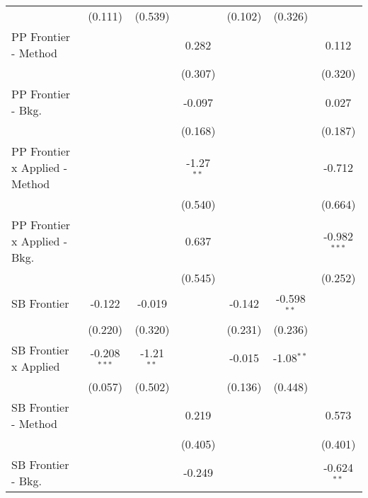 \begin{tabular}{lcccccc}
                                  & (0.111)        & (0.539)      &               & (0.102)       & (0.326)       &   \\   
   PP Frontier - Method           &                &              & 0.282         &               &               & 0.112\\   
                                  &                &              & (0.307)       &               &               & (0.320)\\   
   PP Frontier - Bkg.             &                &              & -0.097        &               &               & 0.027\\   
                                  &                &              & (0.168)       &               &               & (0.187)\\   
   PP Frontier x Applied - Method &                &              & -1.27$^{**}$  &               &               & -0.712\\   
                                  &                &              & (0.540)       &               &               & (0.664)\\   
   PP Frontier x Applied - Bkg.   &                &              & 0.637         &               &               & -0.982$^{***}$\\   
                                  &                &              & (0.545)       &               &               & (0.252)\\   
   SB Frontier                    & -0.122         & -0.019       &               & -0.142        & -0.598$^{**}$ &   \\   
                                  & (0.220)        & (0.320)      &               & (0.231)       & (0.236)       &   \\   
   SB Frontier x Applied          & -0.208$^{***}$ & -1.21$^{**}$ &               & -0.015        & -1.08$^{**}$  &   \\   
                                  & (0.057)        & (0.502)      &               & (0.136)       & (0.448)       &   \\   
   SB Frontier - Method           &                &              & 0.219         &               &               & 0.573\\   
                                  &                &              & (0.405)       &               &               & (0.401)\\   
   SB Frontier - Bkg.             &                &              & -0.249        &               &               & -0.624$^{**}$\\   

\end{tabular}
